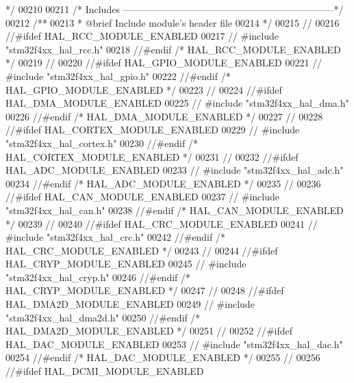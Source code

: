\begin{DoxyCode}
{                 */}
00210 
00211 \textcolor{comment}{/* Includes ------------------------------------------------------------------*/}
00212 \textcolor{comment}{/**}
00213 \textcolor{comment}{  * @brief Include module's header file }
00214 \textcolor{comment}{  */}
00215 \textcolor{comment}{//}
00216 \textcolor{comment}{//#ifdef HAL\_RCC\_MODULE\_ENABLED}
00217 \textcolor{comment}{//  #include "stm32f4xx\_hal\_rcc.h"}
00218 \textcolor{comment}{//#endif /* HAL\_RCC\_MODULE\_ENABLED */}
00219 \textcolor{comment}{//}
00220 \textcolor{comment}{//#ifdef HAL\_GPIO\_MODULE\_ENABLED}
00221 \textcolor{comment}{//  #include "stm32f4xx\_hal\_gpio.h"}
00222 \textcolor{comment}{//#endif /* HAL\_GPIO\_MODULE\_ENABLED */}
00223 \textcolor{comment}{//}
00224 \textcolor{comment}{//#ifdef HAL\_DMA\_MODULE\_ENABLED}
00225 \textcolor{comment}{//  #include "stm32f4xx\_hal\_dma.h"}
00226 \textcolor{comment}{//#endif /* HAL\_DMA\_MODULE\_ENABLED */}
00227 \textcolor{comment}{//}
00228 \textcolor{comment}{//#ifdef HAL\_CORTEX\_MODULE\_ENABLED}
00229 \textcolor{comment}{//  #include "stm32f4xx\_hal\_cortex.h"}
00230 \textcolor{comment}{//#endif /* HAL\_CORTEX\_MODULE\_ENABLED */}
00231 \textcolor{comment}{//}
00232 \textcolor{comment}{//#ifdef HAL\_ADC\_MODULE\_ENABLED}
00233 \textcolor{comment}{//  #include "stm32f4xx\_hal\_adc.h"}
00234 \textcolor{comment}{//#endif /* HAL\_ADC\_MODULE\_ENABLED */}
00235 \textcolor{comment}{//}
00236 \textcolor{comment}{//#ifdef HAL\_CAN\_MODULE\_ENABLED}
00237 \textcolor{comment}{//  #include "stm32f4xx\_hal\_can.h"}
00238 \textcolor{comment}{//#endif /* HAL\_CAN\_MODULE\_ENABLED */}
00239 \textcolor{comment}{//}
00240 \textcolor{comment}{//#ifdef HAL\_CRC\_MODULE\_ENABLED}
00241 \textcolor{comment}{//  #include "stm32f4xx\_hal\_crc.h"}
00242 \textcolor{comment}{//#endif /* HAL\_CRC\_MODULE\_ENABLED */}
00243 \textcolor{comment}{//}
00244 \textcolor{comment}{//#ifdef HAL\_CRYP\_MODULE\_ENABLED}
00245 \textcolor{comment}{//  #include "stm32f4xx\_hal\_cryp.h"}
00246 \textcolor{comment}{//#endif /* HAL\_CRYP\_MODULE\_ENABLED */}
00247 \textcolor{comment}{//}
00248 \textcolor{comment}{//#ifdef HAL\_DMA2D\_MODULE\_ENABLED}
00249 \textcolor{comment}{//  #include "stm32f4xx\_hal\_dma2d.h"}
00250 \textcolor{comment}{//#endif /* HAL\_DMA2D\_MODULE\_ENABLED */}
00251 \textcolor{comment}{//}
00252 \textcolor{comment}{//#ifdef HAL\_DAC\_MODULE\_ENABLED}
00253 \textcolor{comment}{//  #include "stm32f4xx\_hal\_dac.h"}
00254 \textcolor{comment}{//#endif /* HAL\_DAC\_MODULE\_ENABLED */}
00255 \textcolor{comment}{//}
00256 \textcolor{comment}{//#ifdef HAL\_DCMI\_MODULE\_ENABLED}

\end{DoxyCode}
